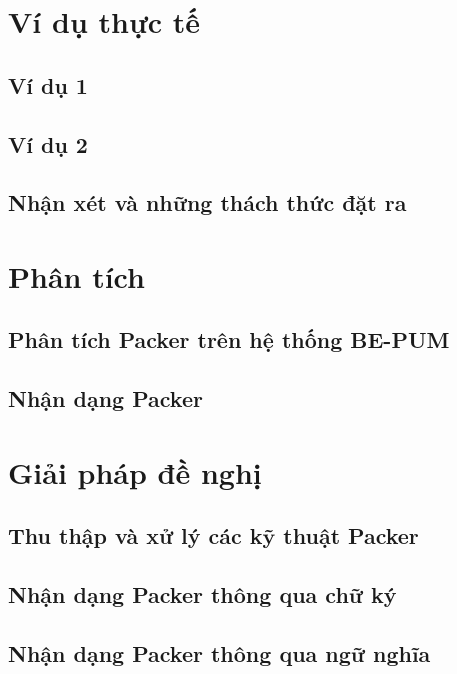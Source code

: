 \section{Ví dụ thực tế}

\subsection{Ví dụ 1}

\subsection{Ví dụ 2}

\subsection{Nhận xét và những thách thức đặt ra}

\section{Phân tích}

\subsection {Phân tích Packer trên hệ thống BE-PUM}

\subsection {Nhận dạng Packer}

\section{Giải pháp đề nghị}

\subsection {Thu thập và xử lý các kỹ thuật Packer}

\subsection {Nhận dạng Packer thông qua chữ ký}

\subsection {Nhận dạng Packer thông qua ngữ nghĩa}